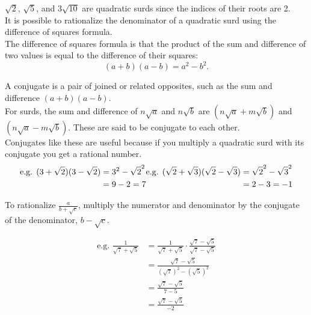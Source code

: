 \documentclass{article}
\begin{document}
$\sqrt{2}$, $\sqrt{5}$, and $3\sqrt{10}$ are quadratic surds since the indices of their roots are 2.\\

It is possible to rationalize the denominator of a quadratic surd using the difference of squares formula.\\

The difference of squares formula is that the product of the sum and difference of two values is equal to the difference of their squares:\\

$$(a+b)(a-b)=a^2-b^2.$$

\newpage

A conjugate is a pair of joined or related opposites, such as the sum and difference $(a+b)(a-b)$.\\

For surds, the sum and difference of $n\sqrt{a}$ and $n\sqrt{b}$ are $(n\sqrt{a}+m\sqrt{b})$ and $(n\sqrt{a}-m\sqrt{b})$. These are said to be conjugate to each other.\\

Conjugates like these are useful because if you multiply a quadratic surd with its conjugate you get a rational number.\\

\begin{equation*}
\begin{split}
\textrm{e.g. }(3+\sqrt{2})(3-\sqrt{2})
&=3^2-{\sqrt{2}}^2\\
&=9-2=7\\
\end{split}

\vspace{32pt}
\begin{split}
\textrm{e.g. }(\sqrt{2}+\sqrt{3})(\sqrt{2}-\sqrt{3})
&={\sqrt{2}}^2-{\sqrt{3} }^2\\
&=2-3=-1
\end{split}
\end{equation*}

\newpage

To rationalize \Large$\frac{a}{b+\sqrt{c}}$\normalsize, multiply the numerator and denominator by the conjugate of the denominator, $b-\sqrt{c}$.

\begin{equation*}
\begin{split}
\textrm{e.g. }
\frac{1}{\sqrt{7}+\sqrt{5}}
&=\frac{1}{\sqrt{7}+\sqrt{5}}
\cdot\frac{\sqrt{7}-\sqrt{5}}{\sqrt{7}-\sqrt{5}}\\
&=\frac{\sqrt{7}-\sqrt{5}}{(\sqrt{7})^2-(\sqrt{5})^2}\\
&=\frac{\sqrt{7}-\sqrt{5}}{7-5}\\
&=\frac{\sqrt{7}-\sqrt{5}}{-2}
\end{split}
\end{equation*}
\end{document}
